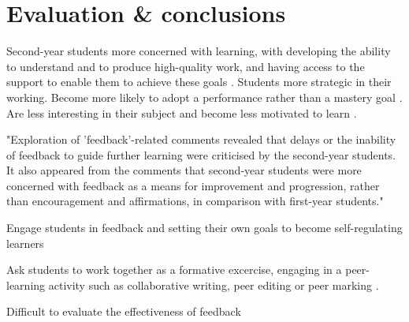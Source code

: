 \chapter{Evaluation \& conclusions}\label{ch:conc}

Second-year students more concerned with learning, with developing the ability to understand and to produce high-quality work, and having access to the support to enable them to achieve these goals \citep{Zaitseva2013}. Students more strategic in their working. Become more likely to adopt a performance rather than a mastery goal \citep{Lieberman2007}. Are less interesting in their subject and become less motivated to learn \citep{Lieberman2007}.

"Exploration of 'feedback'-related comments revealed that delays or the
inability of feedback to guide further learning were criticised by the
second-year students. It also appeared from the comments that second-year
students were more concerned with feedback as a means for improvement
and progression, rather than encouragement and affirmations, in comparison
with first-year students." \citep{Zaitseva2013}

Engage students in feedback and setting their own goals to become self-regulating learners \citep{Nicol2006}

Ask students to work together as a formative excercise, engaging in a peer-learning activity such as collaborative writing, peer editing or peer marking \citep[chapter 1]{Falchikov2001}.

Difficult to evaluate the effectiveness of feedback \citep{Price2010}
